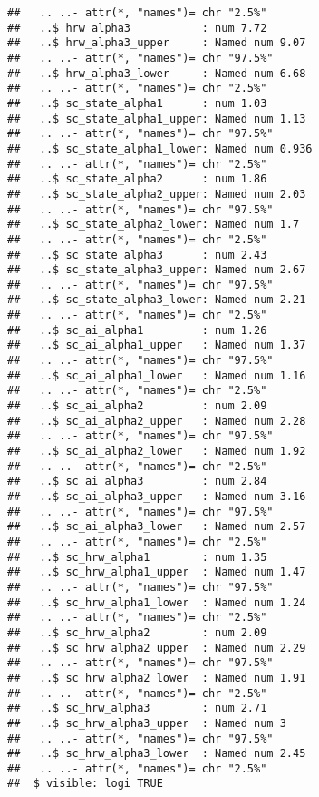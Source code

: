 \documentclass[12pt,letterpaper,leqno]{article}\usepackage[]{graphicx}\usepackage[]{color}
\makeatletter
\newenvironment{kframe}{%
 \def\at@end@of@kframe{}%
 \ifinner\ifhmode%
  \def\at@end@of@kframe{\end{minipage}}%
  \begin{minipage}{\columnwidth}%
 \fi\fi%
 \def\FrameCommand##1{\hskip\@totalleftmargin \hskip-\fboxsep
 \colorbox{shadecolor}{##1}\hskip-\fboxsep
     \hskip-\linewidth \hskip-\@totalleftmargin \hskip\columnwidth}%
 \MakeFramed {\advance\hsize-\width
   \@totalleftmargin\z@ \linewidth\hsize
   \@setminipage}}%
 {\par\unskip\endMakeFramed%
 \at@end@of@kframe}
\newenvironment{knitrout}{}{} %
\makeatother
\begin{document}
\begin{knitrout}
\begin{kframe}
\begin{verbatim}
##   .. ..- attr(*, "names")= chr "2.5%"
##   ..$ hrw_alpha3           : num 7.72
##   ..$ hrw_alpha3_upper     : Named num 9.07
##   .. ..- attr(*, "names")= chr "97.5%"
##   ..$ hrw_alpha3_lower     : Named num 6.68
##   .. ..- attr(*, "names")= chr "2.5%"
##   ..$ sc_state_alpha1      : num 1.03
##   ..$ sc_state_alpha1_upper: Named num 1.13
##   .. ..- attr(*, "names")= chr "97.5%"
##   ..$ sc_state_alpha1_lower: Named num 0.936
##   .. ..- attr(*, "names")= chr "2.5%"
##   ..$ sc_state_alpha2      : num 1.86
##   ..$ sc_state_alpha2_upper: Named num 2.03
##   .. ..- attr(*, "names")= chr "97.5%"
##   ..$ sc_state_alpha2_lower: Named num 1.7
##   .. ..- attr(*, "names")= chr "2.5%"
##   ..$ sc_state_alpha3      : num 2.43
##   ..$ sc_state_alpha3_upper: Named num 2.67
##   .. ..- attr(*, "names")= chr "97.5%"
##   ..$ sc_state_alpha3_lower: Named num 2.21
##   .. ..- attr(*, "names")= chr "2.5%"
##   ..$ sc_ai_alpha1         : num 1.26
##   ..$ sc_ai_alpha1_upper   : Named num 1.37
##   .. ..- attr(*, "names")= chr "97.5%"
##   ..$ sc_ai_alpha1_lower   : Named num 1.16
##   .. ..- attr(*, "names")= chr "2.5%"
##   ..$ sc_ai_alpha2         : num 2.09
##   ..$ sc_ai_alpha2_upper   : Named num 2.28
##   .. ..- attr(*, "names")= chr "97.5%"
##   ..$ sc_ai_alpha2_lower   : Named num 1.92
##   .. ..- attr(*, "names")= chr "2.5%"
##   ..$ sc_ai_alpha3         : num 2.84
##   ..$ sc_ai_alpha3_upper   : Named num 3.16
##   .. ..- attr(*, "names")= chr "97.5%"
##   ..$ sc_ai_alpha3_lower   : Named num 2.57
##   .. ..- attr(*, "names")= chr "2.5%"
##   ..$ sc_hrw_alpha1        : num 1.35
##   ..$ sc_hrw_alpha1_upper  : Named num 1.47
##   .. ..- attr(*, "names")= chr "97.5%"
##   ..$ sc_hrw_alpha1_lower  : Named num 1.24
##   .. ..- attr(*, "names")= chr "2.5%"
##   ..$ sc_hrw_alpha2        : num 2.09
##   ..$ sc_hrw_alpha2_upper  : Named num 2.29
##   .. ..- attr(*, "names")= chr "97.5%"
##   ..$ sc_hrw_alpha2_lower  : Named num 1.91
##   .. ..- attr(*, "names")= chr "2.5%"
##   ..$ sc_hrw_alpha3        : num 2.71
##   ..$ sc_hrw_alpha3_upper  : Named num 3
##   .. ..- attr(*, "names")= chr "97.5%"
##   ..$ sc_hrw_alpha3_lower  : Named num 2.45
##   .. ..- attr(*, "names")= chr "2.5%"
##  $ visible: logi TRUE
\end{verbatim}
\end{kframe}
\end{knitrout}
\end{document}
